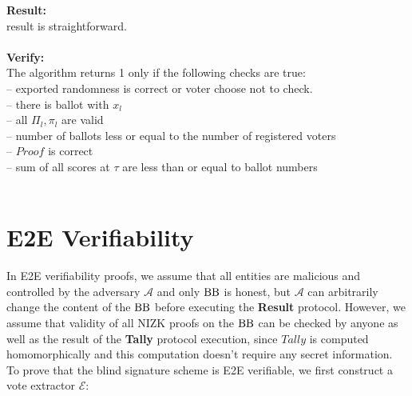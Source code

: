 \textbf{Result:} \\
result is straightforward.\\\\
\textbf{Verify:} \\
The algorithm returns 1 only if the following checks are true:\\
--  exported randomness is correct or voter choose not to check.\\
-- there is ballot with $x_l$\\
-- all $\Pi_l, \pi_l$ are valid\\
-- number of ballots less or equal to the number of registered voters\\
-- $Proof$ is correct\\
-- sum of all scores at $\tau$ are less than or equal to ballot numbers\\\\
\section{E2E Verifiability}
In E2E verifiability proofs, we assume that all entities are malicious and controlled by the adversary $\mathcal{A}$ and only $\operatorname{BB}$ is honest, but  $\mathcal{A}$ can arbitrarily change the content of the $\operatorname{BB}$  before executing the \textbf{Result} protocol. However, we assume that validity of all NIZK proofs on the $\operatorname{BB}$ can be checked by anyone as well as the result of the \textbf{Tally} protocol execution, since $Tally$ is computed homomorphically and this computation doesn't require any secret information. To prove that the blind signature scheme is E2E verifiable, we first construct a vote extractor $\mathcal{E}$:\\
 
